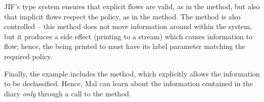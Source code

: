 JIF's type system ensures that explicit flows are valid, as in the  method, but also that implicit flows respect the policy, as in the  method. The  method is also controlled -- this method does not move information around within the system, but it produces a side effect (printing to a stream) which causes information to flow; hence, the  being printed to must have its label parameter matching the required policy.

Finally, the example includes the  method, which explicitly allows the information to be declassified. Hence, Mal can learn about the information contained in the diary \textit{only} through a call to the  method.